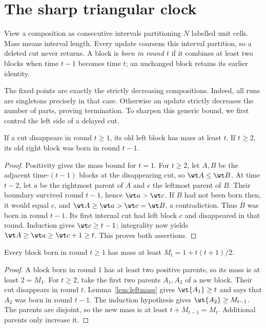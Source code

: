 \section{The sharp triangular clock}
View a composition as consecutive intervals partitioning $N$ labelled unit
cells. Mass means interval length. Every update coarsens this interval
partition, so a deleted cut never returns. A block is \emph{born in round
$t$} if it combines at least two blocks when time $t-1$ becomes time $t$;
an unchanged block retains its earlier identity.

The fixed points are exactly the strictly decreasing compositions. Indeed,
all runs are singletons precisely in that case. Otherwise an update
strictly decreases the number of parts, proving termination. To sharpen
this generic bound, we first control the left side of a delayed cut.

\begin{lemma}\label{lem:leftmass}
If a cut disappears in round $t\ge1$, its old left block has mass at least
$t$. If $t\ge2$, its old right block was born in round $t-1$.
\end{lemma}
\begin{proof}
Positivity gives the mass bound for $t=1$. For $t\ge2$, let $A,B$ be the
adjacent time-$(t-1)$ blocks at the disappearing cut, so
$\wt A\le\wt B$. At time $t-2$, let $a$ be the rightmost parent of $A$
and $c$ the leftmost parent of $B$. Their boundary survived round $t-1$,
hence $\wt a>\wt c$. If $B$ had not been born then, it would equal $c$,
and $\wt A\ge\wt a>\wt c=\wt B$, a contradiction. Thus $B$ was born in
round $t-1$. Its first internal cut had left block $c$ and disappeared in
that round. Induction gives $\wt c\ge t-1$; integrality now yields
$\wt A\ge\wt a\ge\wt c+1\ge t$. This proves both assertions.
\end{proof}

\begin{lemma}\label{lem:birthmass}
Every block born in round $t\ge1$ has mass at least
$M_t=1+t(t+1)/2$.
\end{lemma}
\begin{proof}
A block born in round $1$ has at least two positive parents, so its mass is
at least $2=M_1$. For $t\ge2$, take the first two parents $A_1,A_2$ of a
new block. Their cut disappears in round $t$. Lemma~\ref{lem:leftmass}
gives $\wt{A_1}\ge t$ and says that $A_2$ was born in round $t-1$.
The induction hypothesis gives $\wt{A_2}\ge M_{t-1}$. The parents are
disjoint, so the new mass is at least $t+M_{t-1}=M_t$. Additional parents
only increase it.
\end{proof}

